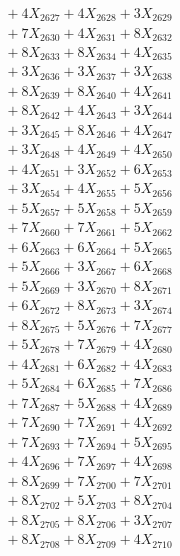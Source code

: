 \documentclass[a4paper,10pt]{article}
\begin{document}
{\begin{align}
&\;  + 4 X_{2627} + 4 X_{2628} + 3 X_{2629} \\[0.3ex]
&\;  + 7 X_{2630} + 4 X_{2631} + 8 X_{2632} \\[0.3ex]
&\;  + 8 X_{2633} + 8 X_{2634} + 4 X_{2635} \\[0.3ex]
&\;  + 3 X_{2636} + 3 X_{2637} + 3 X_{2638} \\[0.3ex]
&\;  + 8 X_{2639} + 8 X_{2640} + 4 X_{2641} \\[0.3ex]
&\;  + 8 X_{2642} + 4 X_{2643} + 3 X_{2644} \\[0.3ex]
&\;  + 3 X_{2645} + 8 X_{2646} + 4 X_{2647} \\[0.3ex]
&\;  + 3 X_{2648} + 4 X_{2649} + 4 X_{2650} \\[0.5ex]\allowbreak
&\;  + 4 X_{2651} + 3 X_{2652} + 6 X_{2653} \\[0.3ex]
&\;  + 3 X_{2654} + 4 X_{2655} + 5 X_{2656} \\[0.3ex]
&\;  + 5 X_{2657} + 5 X_{2658} + 5 X_{2659} \\[0.3ex]
&\;  + 7 X_{2660} + 7 X_{2661} + 5 X_{2662} \\[0.3ex]
&\;  + 6 X_{2663} + 6 X_{2664} + 5 X_{2665} \\[0.3ex]
&\;  + 5 X_{2666} + 3 X_{2667} + 6 X_{2668} \\[0.3ex]
&\;  + 5 X_{2669} + 3 X_{2670} + 8 X_{2671} \\[0.3ex]
&\;  + 6 X_{2672} + 8 X_{2673} + 3 X_{2674} \\[0.3ex]
&\;  + 8 X_{2675} + 5 X_{2676} + 7 X_{2677} \\[0.3ex]
&\;  + 5 X_{2678} + 7 X_{2679} + 4 X_{2680} \\[0.5ex]\allowbreak
&\;  + 4 X_{2681} + 6 X_{2682} + 4 X_{2683} \\[0.3ex]
&\;  + 5 X_{2684} + 6 X_{2685} + 7 X_{2686} \\[0.3ex]
&\;  + 7 X_{2687} + 5 X_{2688} + 4 X_{2689} \\[0.3ex]
&\;  + 7 X_{2690} + 7 X_{2691} + 4 X_{2692} \\[0.3ex]
&\;  + 7 X_{2693} + 7 X_{2694} + 5 X_{2695} \\[0.3ex]
&\;  + 4 X_{2696} + 7 X_{2697} + 4 X_{2698} \\[0.3ex]
&\;  + 8 X_{2699} + 7 X_{2700} + 7 X_{2701} \\[0.3ex]
&\;  + 8 X_{2702} + 5 X_{2703} + 8 X_{2704} \\[0.3ex]
&\;  + 8 X_{2705} + 8 X_{2706} + 3 X_{2707} \\[0.3ex]
&\;  + 8 X_{2708} + 8 X_{2709} + 4 X_{2710} \\[0.5ex]\allowbreak

\end{align}}
\end{document}
